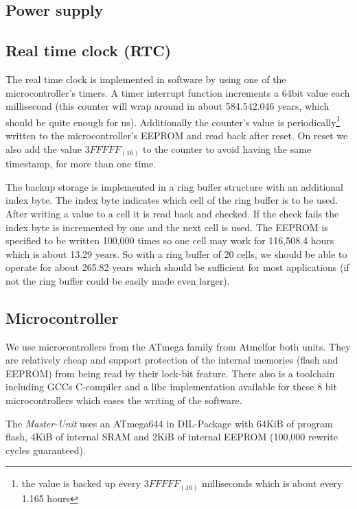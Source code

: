 
\subsection{Power supply}


\subsection{Real time clock (RTC)}
The real time clock is implemented in software by using one of the microcontroller's timers. A timer interrupt function increments a 64bit value each millisecond (this counter will wrap around in about 584.542.046 years, which should be quite enough for us). Additionally the counter's value is periodically\footnote{the value is backed up every $3FFFFF_{(16)}$ milliseconds which is about every 1.165 hours} written to the microcontroller's EEPROM and read back after reset. On reset we also add the value $3FFFFF_{(16)}$ to the counter to avoid having the same timestamp, for more than one time.

The backup storage is implemented in a ring buffer structure with an additional index byte. 
The index byte indicates which cell of the ring buffer is to be used. After writing a value to a cell it is read back and checked. If the check fails the index byte is incremented by one and the next cell is used. The EEPROM is specified to be written 100,000 times so one cell may work for 116,508.4 hours which is about 13.29 years. So with a ring buffer of 20 cells, we should be able to operate for about 265.82 years which should be sufficient for most applications (if not the ring buffer could be easily made even larger).


\subsection{Microcontroller}
We use microcontrollers from the ATmega family from Atmel\cite{Atmel}for both units. They are relatively cheap and support protection of the internal memories (flash and EEPROM) from being read by their lock-bit feature. There also is a toolchain including GCCs\cite{GCC} C-compiler and a libc implementation\cite{AVR-Libc} available for these 8 bit microcontrollers which eases the writing of the software.

The \textit{Master-Unit} uses an ATmega644\cite{ATmega644} in DIL-Package with 64KiB of program flash, 4KiB of internal SRAM and 2KiB of internal EEPROM (100,000 rewrite cycles guaranteed).

